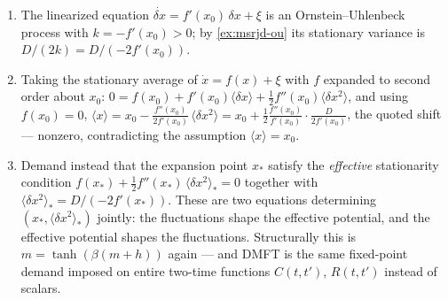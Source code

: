 \documentclass[11pt]{article}
\begin{document}
\begin{solution}[ex:selfconsistency]
\begin{enumerate}
  \item The linearized equation $\dot{\delta x} = f'(x_0)\,\delta x + \xi$ is an Ornstein--Uhlenbeck process with $k = -f'(x_0) > 0$; by \cref{ex:msrjd-ou} its stationary variance is $D/(2k) = D/(-2f'(x_0))$.
  \item Taking the stationary average of $\dot x = f(x) + \xi$ with $f$ expanded to second order about $x_0$:
$0 = f(x_0) + f'(x_0)\langle\delta x\rangle + \tfrac{1}{2} f''(x_0)\langle \delta x^2\rangle$, and using $f(x_0)=0$,
$\langle x\rangle = x_0 - \frac{f''(x_0)}{2f'(x_0)}\,\langle\delta x^2\rangle = x_0 + \frac{1}{2}\frac{f''(x_0)}{f'(x_0)}\cdot\frac{D}{2 f'(x_0)}$,
the quoted shift --- nonzero, contradicting the assumption $\langle x\rangle = x_0$.
  \item Demand instead that the expansion point $x_*$ satisfy the \emph{effective} stationarity condition $f(x_*) + \tfrac{1}{2} f''(x_*)\,\langle\delta x^2\rangle_* = 0$ together with $\langle\delta x^2\rangle_* = D/(-2f'(x_*))$. These are two equations determining $(x_*, \langle\delta x^2\rangle_*)$ jointly: the fluctuations shape the effective potential, and the effective potential shapes the fluctuations. Structurally this is $m = \tanh(\beta(m+h))$ again --- and DMFT is the same fixed-point demand imposed on entire two-time functions $C(t,t')$, $R(t,t')$ instead of scalars.
\end{enumerate}
\end{solution}
\end{document}
